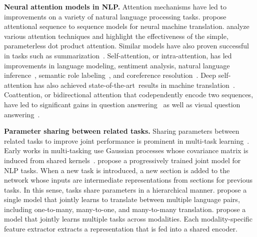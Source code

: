 \documentclass[11pt,a4paper]{article}
\newcommand{\sota}{state-of-the-art}
\begin{document}
\textbf{Neural attention models in NLP.}
Attention mechanisms have led to improvements on a variety of natural language processing tasks.
\citet{Bahdanau2014NeuralMT} propose attentional sequence to sequence models for neural machine translation.
\citet{luong2015effective} analyze various attention techniques and highlight the effectiveness of the simple, parameterless dot product attention.
Similar models have also proven successful in tasks such as summarization~\cite{see2017get,paulus2017deep}.
Self-attention, or intra-attention, has led improvements in language modeling, sentiment analysis, natural language inference~\cite{cheng2016long}, semantic role labeling~\cite{he2017deep}, and coreference resolution~\citep{lee2017end}.
Deep self-attention has also achieved \sota~results in machine translation~\cite{Vaswani2017attention}.
Coattention, or bidirectional attention that codependently encode two sequences, have led to significant gains in question answering~\cite{Xiong2016dynamic,seo2016bidirectional,xiong2018dcn} as well as visual question answering~\cite{lu2016hierarchical}.


\textbf{Parameter sharing between related tasks.}
Sharing parameters between related tasks to improve joint performance is prominent in multi-task learning~\cite{caruana1998multitask,thrun1996learning}.
Early works in multi-tasking use Gaussian processes whose covariance matrix is induced from shared kernels~\cite{lawrence2004learning,yu2005learning,seeger2005semiparametric,bonilla2008multi}.
\citet{Hashimoto2017joint} propose a progressively trained joint model for NLP tasks.
When a new task is introduced, a new section is added to the network whose inputs are intermediate representations from sections for previous tasks.
In this sense, tasks share parameters in a hierarchical manner.
\citet{johnson2016google} propose a single model that jointly learns to translate between multiple language pairs, including one-to-many, many-to-one, and many-to-many translation.
\citet{kaiser2017one} propose a model that jointly learns multiple tasks across modalities.
Each modality-specific feature extractor extracts a representation that is fed into a shared encoder.
\end{document}
